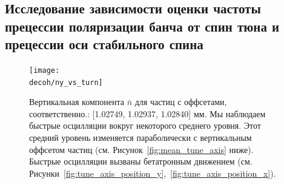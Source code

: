 \documentclass{report}
\newcommand{\Artem}{/Users/alexaksentyev/REPOS/COSYINF/img/Artem}
\newcommand{\decoh}{\Artem/decoherence_frequency_dependence}
\begin{document}
\subsection{Исследование зависимости оценки частоты прецессии поляризации банча от спин тюна и прецессии оси стабильного спина}

\begin{figure}[H]
  \centering
  \texttt{[image: \\decoh/ny\_vs\_turn]}
  \caption{Вертикальная компонента $\bar n$ для частиц с оффсетами,
    соответственно.: [1.02749, 1.02937, 1.02840] мм. Мы наблюдаем
    быстрые осцилляции вокруг некоторого среднего уровня. Этот средний
    уровень изменяется параболически с вертикальным оффсетом частиц
    (см. Рисунок~\ref{fig:mean_tune_axis} ниже). Быстрые осцилляции
    вызваны бетатронным движением (см. Рисунки~\ref{fig:tune_axis_position_y},~\ref{fig:tune_axis_position_x}).\label{fig:ny_vs_turn}}
\end{figure}
\end{document}
